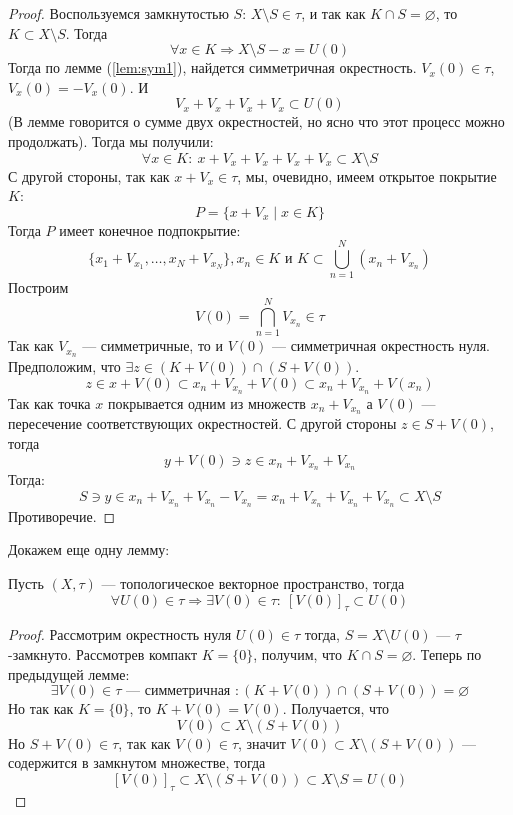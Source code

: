 {\begin{proof}
	Воспользуемся замкнутостью $S$: $X \setminus S \in \tau$, и так как $K \cap S = \varnothing$, то $K \subset X \setminus S$. Тогда 
	$$
	\forall x \in K \Rightarrow X\setminus S - x  = U(0)
	$$
	Тогда по лемме (\ref{lem:sym1}), найдется симметричная окрестность. $V_x(0) \in \tau$, $V_x(0) = - V_x(0)$. И 
	$$
	V_x + V_x + V_x + V_x \subset U(0)
	$$
	(В лемме говорится о сумме двух окрестностей, но ясно что этот процесс можно продолжать). Тогда мы получили:
	$$
	\forall x \in K : \ x + V_x + V_x + V_x + V_x \subset X\setminus S
	$$
	С другой стороны, так как $x + V_x \in \tau$, мы, очевидно, имеем открытое покрытие $K$:
	$$
	P = \{x + V_x \mid x \in K\}
	$$
	Тогда $P$ имеет конечное подпокрытие: 
	$$
	\{x_1 + V_{x_1}, \dots, x_N + V_{x_N}\}, x_n \in K \text{ и } K \subset \bigcup_{n=1}^N(x_n + V_{x_n})
	$$
	Построим 
	$$
	V(0) = \bigcap_{n=1}^N V_{x_n} \in \tau
	$$
	Так как $V_{x_n}$ --- симметричные, то и $V(0)$ --- симметричная окрестность нуля.
	Предположим, что $\exists z \in (K + V(0)) \cap (S + V(0))$. 
	$$
	z \in x + V(0) \subset x_n + V_{x_n} + V(0) \subset x_n + V_{x_n} + V(x_n)
	$$
	Так как точка $x$ покрывается одним из множеств $x_n + V_{x_n}$ а $V(0)$ --- пересечение соответствующих окрестностей. С другой стороны $z \in S + V(0)$, тогда
	$$
	y + V(0) \ni z \in x_n +V_{x_n} + V_{x_n}
	$$
	Тогда: 
	$$
	S \ni y \in x_n + V_{x_n} + V_{x_n} - V_{x_n} = x_n + V_{x_n} + V_{x_n} + V_{x_n} \subset X \setminus S
	$$
	Противоречие. 
\end{proof}

Докажем еще одну лемму:
\begin{lemma}
	\label{lem:dest}
	Пусть $(X, \tau)$ --- топологическое векторное пространство, тогда 
	$$
	\forall U(0) \in \tau \Rightarrow \exists V(0) \in \tau: \ [V(0)]_\tau \subset U(0)
	$$
\end{lemma}

\begin{proof}
	Рассмотрим окрестность нуля $U(0) \in \tau$ тогда, $S = X\setminus U(0)$ --- $\tau$-замкнуто. Рассмотрев компакт $K = \{0\}$, получим, что $K \cap S = \varnothing$. Теперь по предыдущей лемме: 
	$$
	\exists V(0) \in \tau \text{ --- симметричная }: (K + V(0))\cap (S + V(0)) = \varnothing
	$$
	Но так как $K = \{0\}$, то $K + V(0) = V(0)$. Получается, что 
	$$
	V(0) \subset X \setminus (S + V(0))
	$$
	Но $S + V(0) \in \tau$, так как $V(0) \in \tau$, значит $V(0) \subset X \setminus (S + V(0))$ --- содержится в замкнутом множестве, тогда 
	$$
	[V(0)]_\tau \subset X \setminus (S + V(0)) \subset X \setminus S = U(0)
	$$
\end{proof}


}

